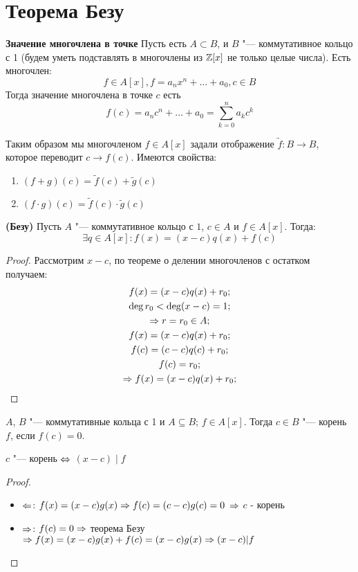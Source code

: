 \section{Теорема Безу}

\begin{Def}{\bf Значение многочлена в точке}
Пусть есть $A \subset B$, и $B$ "---  коммутативное кольцо с 1 (будем уметь подставлять
в многочлены из $\mathbb{Z}[x]$ не только целые числа). Есть многочлен:
\[f \in A[x], f = a_nx^n + \ldots + a_0, c \in B\]
Тогда значение многочлена в точке $c$ есть
\[f(c) = a_nc^n + \ldots + a_0 = \sum_{k = 0}^{n}a_kc^k\]
\end{Def}

\begin{Rem}
Таким образом мы многочленом $f \in A[x]$ задали отображение
$\tilde f : B \to B$, которое переводит $c \to f(c)$. Имеются свойства:
\begin{enumerate}
\item $(f+g)(c)=\tilde f(c) + \tilde g(c)$
\item $(f\cdot g)(c)=\tilde f(c) \cdot \tilde g(c)$
\end{enumerate}
\end{Rem}

\begin{theorem}{}
\textbf{(Безу)}
	Пусть $A$ "--- коммутативное кольцо с $1$, $c \in A$ и $f \in A[x]$. Тогда:
	\[\exists q \in A[x] \colon f(x) = (x - c)q(x) + f(c)\]
\end{theorem}

\begin{proof}
	Рассмотрим $x - c$, по теореме о делении многочленов с остатком получаем:
	\begin{gather*}
	f(x) = (x - c)q(x) + r_0; \\
	\deg r_0 < \deg (x - c) = 1; \\
	\Rightarrow r = r_0 \in A; \\
	f(x) = (x - c)q(x) + r_0; \\
	f(c) = (c - c)q(c) + r_0; \\
	f(c) = r_0; \\
	\Rightarrow f(x) = (x - c)q(x) + r_0; \\
	\end{gather*}
\end{proof}

\begin{Def}
	$A$, $B$ "--- коммутативные кольца с 1 и $A \subseteq B$; $f \in A[x]$. Тогда
	$c \in B$ "--- корень $f$, если $f(c) = 0$.
\end{Def}

\begin{conseq}
	$c$ "--- корень $\Leftrightarrow$ $(x - c) \mid f$\\
\end{conseq}
\begin{proof}
	\begin{itemize}
	\item $\Leftarrow$: $f(x) = (x - c)g(x) \Rightarrow f(c) = (c-c)g(c) = 0$ $\Rightarrow$ $c$ - корень
	\item $\Rightarrow$: $f(c) = 0 \Rightarrow$ теорема Безу $\Rightarrow f(x) = (x-c)g(x) + f(c) = (x-c)g(x) \Rightarrow (x-c) | f$
	\end{itemize}
\end{proof}
